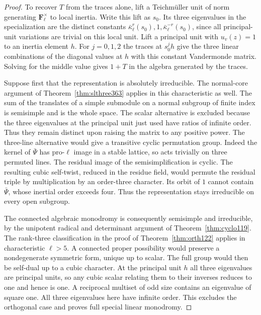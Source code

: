 \documentclass[a4paper,11pt]{article}
\theoremstyle{definition}
\theoremstyle{remark}
\numberwithin{equation}{section}
\begin{document}
\begin{proof}
To recover \(T\) from the traces alone, lift a Teichm\"uller
unit of norm generating \(\mathbf F_\ell^\times\) to local
inertia. Write this lift as \(s_0\). Its three eigenvalues
in the specialization are the distinct constants
\(\bar\kappa_\ell^r(s_0),1,\bar\kappa_\ell^{-r}(s_0)\),
since all principal-unit variations are trivial on this local unit.
Lift a principal unit with \(u_v(z)=1\) to an inertia element
\(h\). For \(j=0,1,2\) the traces at \(s_0^jh\) give the
three linear combinations of the diagonal values at \(h\)
with this constant Vandermonde matrix. Solving for the middle
value gives \(1+T\) in the algebra generated by the traces.

Suppose first that the representation is absolutely
irreducible. The normal-core argument of
Theorem~\ref{thm:slthree363} applies in this characteristic
as well. The sum of the translates of a simple submodule on
a normal subgroup of finite index is semisimple and is the
whole space. The scalar alternative is excluded because the
three eigenvalues at the principal unit just used have
ratios of infinite order. Thus they remain distinct upon
raising the matrix to any positive power. The three-line
alternative would give a transitive cyclic permutation group.
Indeed the kernel of \(\bar\Psi\) has pro-\(\ell\) image in
a stable lattice, so acts trivially on three permuted lines.
The residual image of the semisimplification is cyclic.
The resulting cubic self-twist, reduced in the residue field,
would permute the residual triple by multiplication by an
order-three character. Its orbit of \(1\) cannot contain
\(\bar\Psi\), whose inertial order exceeds four. Thus the
representation stays irreducible on every open subgroup.

The connected algebraic monodromy is consequently semisimple
and irreducible, by the unipotent radical and determinant
argument of Theorem~\ref{thm:cyclo119}. The rank-three
classification in the proof of Theorem~\ref{thm:orth122}
applies in characteristic \(\ell>5\). A connected proper
possibility would preserve a nondegenerate symmetric
form, unique up to scalar. The full group would then be
self-dual up to a cubic character. At the principal unit
\(h\) all three eigenvalues are principal units, so any
cubic scalar relating them to their inverses reduces to
one and hence is one. A reciprocal multiset of odd size
contains an eigenvalue of square one. All three eigenvalues
here have infinite order. This excludes the orthogonal case
and proves full special linear monodromy.


\end{proof}
\end{document}
